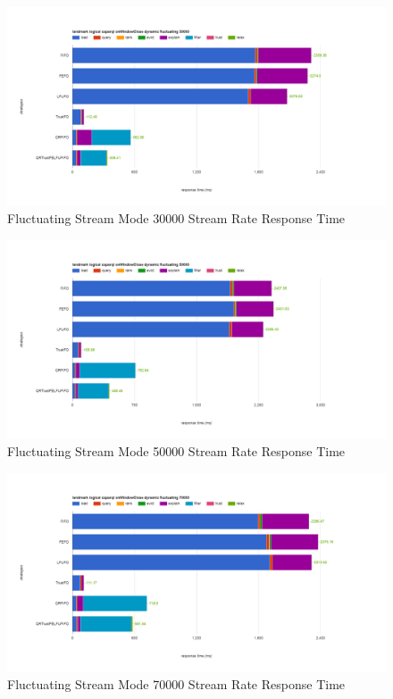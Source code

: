 \begin{figure}[!htbp]
    \centering
    \includegraphics[width=\textwidth]{img/app3-f-30000-r.png}
    \caption{Fluctuating Stream Mode 30000 Stream Rate Response Time}
\end{figure}
\begin{figure}[!htbp]
    \centering
    \includegraphics[width=\textwidth]{img/app3-f-50000-r.png}
    \caption{Fluctuating Stream Mode 50000 Stream Rate Response Time}
\end{figure}
\begin{figure}[!htbp]
    \centering
    \includegraphics[width=\textwidth]{img/app3-f-70000-r.png}
    \caption{Fluctuating Stream Mode 70000 Stream Rate Response Time}
\end{figure}
